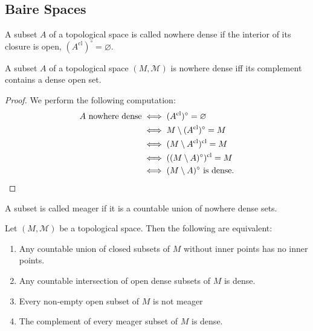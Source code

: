 \documentclass[prb,12pt]{revtex4-2}
\theoremstyle{definition}
\theoremstyle{definition}
\theoremstyle{definition}
\newenvironment{parts}{\begin{enumerate}[label=(\alph*)]}{\end{enumerate}}
\begin{document}
\subsection{Baire Spaces}
	\begin{Definition}
		A subset $A$ of a topological space is called nowhere dense if the interior of its closure is open, $(A^\text{cl})^\circ=\varnothing$. 
	\end{Definition}
\begin{Theorem}
	A subset $A$ of a topological space $(M, \mathcal{M})$ is nowhere dense iff its complement contains a dense open set.
\end{Theorem}
\begin{proof}
		We perform the following computation:
		\begin{align*}
			A\text{ nowhere dense}&\iff (A^\text{cl})^\circ = \varnothing\\
			&\iff M \setminus (A^\text{cl})^\circ = M\\
			&\iff (M \setminus A^\text{cl})^\text{cl}=M\\
			&\iff ((M \setminus A)^\circ)^\text{cl}=M\\
			&\iff (M \setminus A)^\circ\text{ is dense}.\qedhere
		\end{align*}
\end{proof}
\begin{Definition}[Meager]
	A subset is called meager if it is a countable union of nowhere dense sets.
\end{Definition}
\begin{Theorem}\label{thm:bairecond}
	Let $(M, \mathcal{M})$ be a topological space. Then the following are equivalent:
	\begin{parts}
		\item Any countable union of closed subsets of $M$ without inner points has no inner points.
		\item Any countable intersection of open dense subsets of $M$ is dense.
		\item Every non-empty open subset of $M$ is not meager
		\item The complement of every meager subset of $M$ is dense.
	\end{parts}
\end{Theorem}
\end{document}
